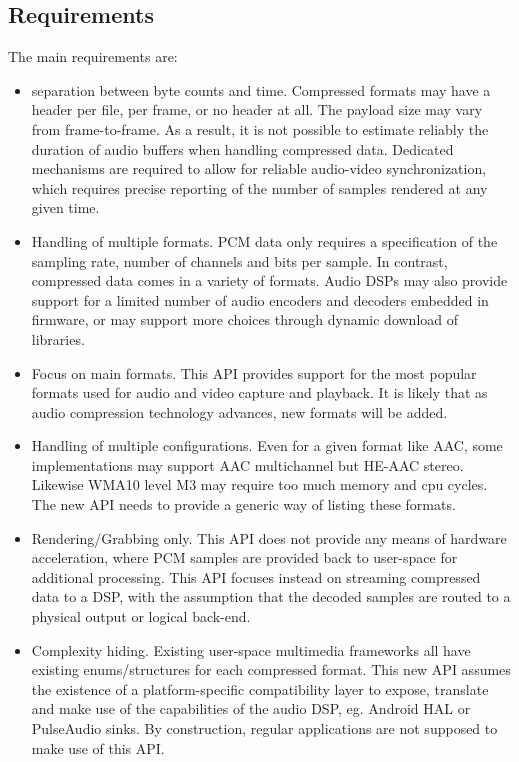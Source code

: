 \documentclass[a4paper,8pt,english]{sphinxmanual}
\begin{document}
\subsection{Requirements}
\label{sound/designs/compress-offload:requirements}
The main requirements are:
\begin{itemize}
\item {} 
separation between byte counts and time. Compressed formats may have
a header per file, per frame, or no header at all. The payload size
may vary from frame-to-frame. As a result, it is not possible to
estimate reliably the duration of audio buffers when handling
compressed data. Dedicated mechanisms are required to allow for
reliable audio-video synchronization, which requires precise
reporting of the number of samples rendered at any given time.

\item {} 
Handling of multiple formats. PCM data only requires a specification
of the sampling rate, number of channels and bits per sample. In
contrast, compressed data comes in a variety of formats. Audio DSPs
may also provide support for a limited number of audio encoders and
decoders embedded in firmware, or may support more choices through
dynamic download of libraries.

\item {} 
Focus on main formats. This API provides support for the most
popular formats used for audio and video capture and playback. It is
likely that as audio compression technology advances, new formats
will be added.

\item {} 
Handling of multiple configurations. Even for a given format like
AAC, some implementations may support AAC multichannel but HE-AAC
stereo. Likewise WMA10 level M3 may require too much memory and cpu
cycles. The new API needs to provide a generic way of listing these
formats.

\item {} 
Rendering/Grabbing only. This API does not provide any means of
hardware acceleration, where PCM samples are provided back to
user-space for additional processing. This API focuses instead on
streaming compressed data to a DSP, with the assumption that the
decoded samples are routed to a physical output or logical back-end.

\item {} 
Complexity hiding. Existing user-space multimedia frameworks all
have existing enums/structures for each compressed format. This new
API assumes the existence of a platform-specific compatibility layer
to expose, translate and make use of the capabilities of the audio
DSP, eg. Android HAL or PulseAudio sinks. By construction, regular
applications are not supposed to make use of this API.

\end{itemize}
\end{document}
